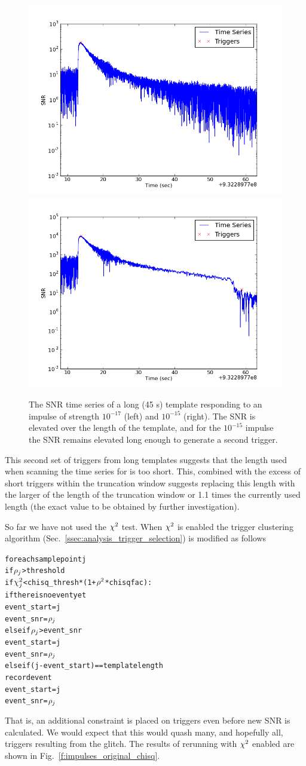 \begin{figure}
  \includegraphics[width=0.5\linewidth]{figures/detchar/snrs_17_long}
  \includegraphics[width=0.5\linewidth]{figures/detchar/snrs_15_long}
  \caption[SNR time series of a long template and loud impulse] {
  \label{f:long_snr_series}
The SNR time series of a long (45 s) template responding to an
impulse of strength $10^{-17}$ (left) and $10^{-15}$ (right).  The SNR
is elevated over the length of the template, and for the $10^{-15}$
impulse the SNR remains elevated long enough to generate a second
trigger.}
\end{figure}%

This second set of triggers from long templates suggests that the
length used when scanning the time series for is too short.  This,
combined with the excess of short triggers within the truncation
window suggests replacing this length with the larger of the length of
the truncation window or 1.1 times the currently used length (the
exact value to be obtained by further investigation).

So far we have not used the $\chi^2$ test.  When $\chi^2$ is enabled
the trigger clustering algorithm
(Sec.~\ref{ssec:analysis_trigger_selection}) is modified as follows
%
\begin{alltt}
for each sample point j
  if \(\rho\sb{j}\) > threshold
    if \(\chisq\sb{j}\) < chisq\_thresh * (1 + \(\rho\sp{2}\) * chisqfac ):
      if there is no event yet
        event\_start = j
        event\_snr   = \(\rho\sb{j}\)
      else if \(\rho\sb{j}\) > event\_snr
        event\_start = j
        event\_snr = \(\rho\sb{j}\)
      else if (j - event\_start) == template length
        record event
        event\_start = j
        event\_snr   = \(\rho\sb{j}\)
\end{alltt}
%
That is, an additional constraint is placed on triggers even before
new SNR is calculated.  We would expect that this would quash many,
and hopefully all, triggers resulting from the glitch.  The results of
rerunning with $\chi^2$ enabled are shown in
Fig.~\ref{f:impulses_original_chisq}.

